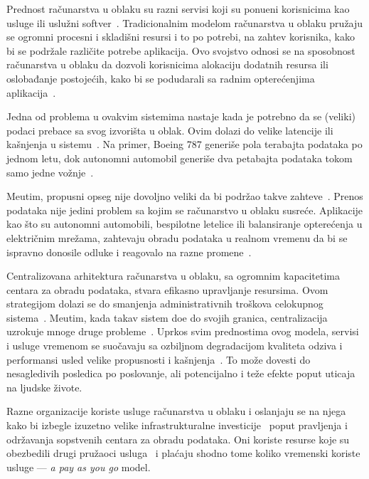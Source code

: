 Prednost ra\v cunarstva u oblaku su razni servisi koji su ponu\dj eni korisnicima kao usluge ili uslu\v zni softver~\cite{Vogels}. Tradicionalnim modelom ra\v cunarstva u oblaku pružaju se ogromni procesni i skladi\v sni resursi i to po potrebi, na zahtev korisnika, kako bi se podr\v zale razli\v cite potrebe aplikacija. Ovo svojstvo odnosi se na sposobnost ra\v cunarstva u oblaku da dozvoli korisnicima alokaciju dodatnih resursa ili oslobađanje postoje\'cih, kako bi se podudarali sa radnim optere\'cenjima aplikacija~\cite{AssuncaoVB18}. 

Jedna od problema u ovakvim sistemima nastaje kada je potrebno da se (veliki) podaci prebace sa svog izvori\v sta u oblak. Ovim dolazi do velike latencije ili ka\v snjenja u sistemu~\cite {HossainRH18}. Na primer, Boeing 787 generi\v se pola terabajta podataka po jednom letu, dok autonomni automobil generi\v se dva petabajta podataka tokom samo jedne vo\v znje~\cite{CaoZS18}. 

Me\dj utim, propusni opseg nije dovoljno veliki da bi podr\v zao takve zahteve~\cite{CaoZS18}. Prenos podataka nije jedini problem sa kojim se ra\v cunarstvo u oblaku susre\'ce. Aplikacije kao \v sto su autonomni automobili, bespilotne letelice ili balansiranje optere\'cenja u elektri\v cnim mre\v zama, zahtevaju obradu podataka u realnom vremenu da bi se ispravno donosile odluke i reagovalo na razne promene~\cite{CaoZS18}.

Centralizovana arhitektura ra\v cunarstva u oblaku, sa ogromnim kapacitetima centara za obradu podataka, stvara efikasno upravljanje resursima. Ovom strategijom dolazi se do smanjenja administrativnih tro\v skova celokupnog sistema~\cite{BariBEGPRZZ13}. Me\dj utim, kada takav sistem do\dj e do svojih granica, centralizacija uzrokuje mnoge druge probleme~\cite{GunawiHSLSAE16, LopezMEDHIBFR15}. Uprkos svim prednostima ovog modela, servisi i usluge vremenom se suo\v cavaju sa ozbiljnom degradacijom kvaliteta odziva i performansi usled velike propusnosti i ka\v snjenja~\cite{KarimIWGSYO16}. To mo\v ze dovesti do nesagledivih posledica po poslovanje, ali potencijalno i te\v ze efekte poput uticaja na ljudske \v zivote. 

Razne organizacije koriste usluge ra\v cunarstva u oblaku i oslanjaju se na njega kako bi izbegle izuzetno velike infrastrukturalne investicije~\cite {MonsalveCC18} poput pravljenja i odr\v zavanja sopstvenih centara za obradu podataka. Oni koriste resurse koje su obezbedili drugi pru\v zaoci usluga~\cite{Satyanarayanan17} i pla\'caju shodno tome koliko vremenski koriste usluge --- \emph{a pay as you go} model.

